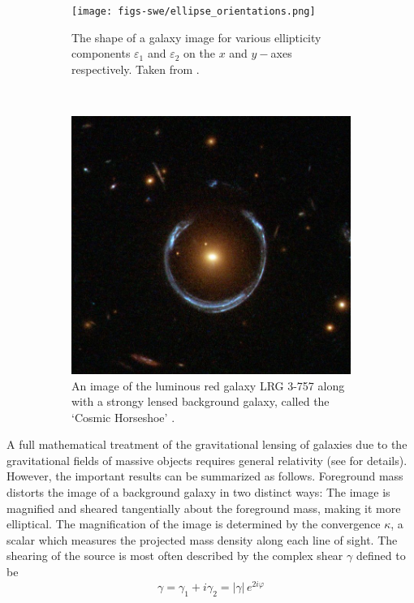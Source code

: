 \documentclass[%
 reprint,
 amsmath,amssymb,
 aps,nofootinbib
]{revtex4-1}
\begin{document}
\begin{figure}
    \centering
    \begin{subfigure}[H]{0.415\textwidth}
        \texttt{[image: figs-swe/ellipse\_orientations.png]}
        \captionsetup{justification=raggedright,singlelinecheck=false}
        \caption{The shape of a galaxy image for various ellipticity components $\varepsilon_1$ and $\varepsilon_2$ on the $x$ and $y-$axes respectively. Taken from \cite{schneider}.}
        \label{ellipses}
    \end{subfigure}
    ~
    \begin{subfigure}[H]{0.425\textwidth}
        \includegraphics[width=\textwidth]{figs-swe/einstein_ring.png}
        \captionsetup{justification=raggedright,singlelinecheck=false}
        \caption{An image of the luminous red galaxy LRG 3-757 along with a strongy lensed background galaxy, called the `Cosmic Horseshoe' \cite{einstein_ring}.}
        \label{einstein_ring}
    \end{subfigure}
    \caption{}
\end{figure}

A full mathematical treatment of the gravitational lensing of galaxies due to the gravitational fields of massive objects requires general relativity (see \cite{modern_cosmology} for details). However, the important results can be summarized as follows. Foreground mass distorts the image of a background galaxy in two distinct ways: The image is magnified and sheared tangentially about the foreground mass, making it more elliptical. The magnification of the image is determined by the convergence $\kappa$, a scalar which measures the projected mass density along each line of sight. The shearing of the source is most often described by the complex shear $\gamma$ defined to be
\begin{equation}\label{complex_shear}
\gamma=\gamma_1+i\gamma_2=|\gamma|\,e^{2i\varphi}
\end{equation}
\end{document}
